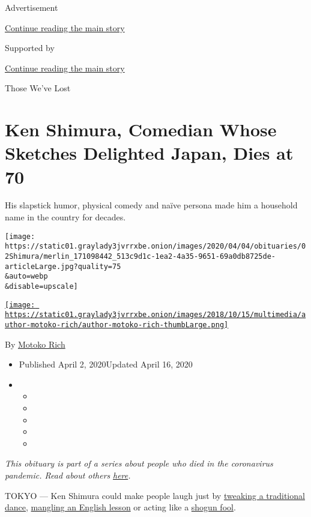 Advertisement

\protect\hyperlink{after-top}{Continue reading the main story}

Supported by

\protect\hyperlink{after-sponsor}{Continue reading the main story}

Those We've Lost

\hypertarget{ken-shimura-comedian-whose-sketches-delighted-japan-dies-at-70}{%
\section{Ken Shimura, Comedian Whose Sketches Delighted Japan, Dies at
70}\label{ken-shimura-comedian-whose-sketches-delighted-japan-dies-at-70}}

His slapstick humor, physical comedy and naïve persona made him a
household name in the country for decades.

\texttt{[image: https://static01.graylady3jvrrxbe.onion/images/2020/04/04/obituaries/02Shimura/merlin\_171098442\_513c9d1c-1ea2-4a35-9651-69a0db8725de-articleLarge.jpg?quality=75\\\&auto=webp\\\&disable=upscale]}

\href{https://www.nytimes3xbfgragh.onion/by/motoko-rich}{\texttt{[image: https://static01.graylady3jvrrxbe.onion/images/2018/10/15/multimedia/author-motoko-rich/author-motoko-rich-thumbLarge.png]}}

By \href{https://www.nytimes3xbfgragh.onion/by/motoko-rich}{Motoko Rich}

\begin{itemize}
\item
  Published April 2, 2020Updated April 16, 2020
\item
  \begin{itemize}
  \item
  \item
  \item
  \item
  \item
  \end{itemize}
\end{itemize}

\emph{This obituary is part of a series about people who died in the
coronavirus pandemic. Read about others}
\href{https://www.nytimes3xbfgragh.onion/series/people-who-have-died-of-the-coronavirus}{\emph{here}}\emph{.}

TOKYO --- Ken Shimura could make people laugh just by
\href{https://www.youtube.com/watch?v=fkdsvAbezj4}{tweaking a
traditional dance},
\href{https://www.youtube.com/watch?v=Ic53hhFllPM}{mangling an English
lesson} or acting like a
\href{https://www.youtube.com/watch?v=UpO5BG96420}{shogun fool}.

